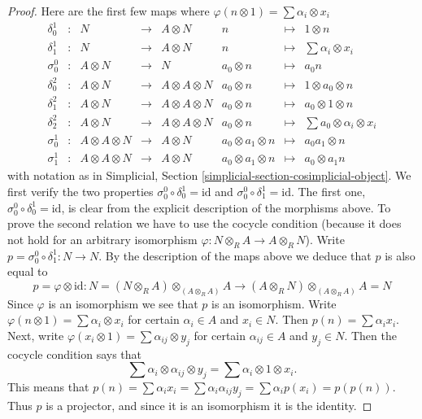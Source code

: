 \begin{proof}
Here are the first few maps
where $\varphi(n \otimes 1) = \sum \alpha_i \otimes x_i$
$$
\begin{matrix}
\delta^1_0 & : & N & \to & A \otimes N & n & \mapsto & 1 \otimes n \\
\delta^1_1 & : & N & \to & A \otimes N & n & \mapsto &
\sum \alpha_i \otimes x_i\\
\sigma^0_0 & : & A \otimes N & \to & N & a_0 \otimes n & \mapsto & a_0n \\
\delta^2_0 & : & A \otimes N & \to & A \otimes A \otimes N &
a_0 \otimes n & \mapsto & 1 \otimes a_0 \otimes n \\
\delta^2_1 & : & A \otimes N & \to & A \otimes A \otimes N &
a_0 \otimes n & \mapsto & a_0 \otimes 1 \otimes n \\
\delta^2_2 & : & A \otimes N & \to & A \otimes A \otimes N &
a_0 \otimes n & \mapsto & \sum a_0 \otimes \alpha_i \otimes x_i \\
\sigma^1_0 & : & A \otimes A \otimes N & \to & A \otimes N &
a_0 \otimes a_1 \otimes n & \mapsto & a_0a_1 \otimes n \\
\sigma^1_1 & : & A \otimes A \otimes N & \to & A \otimes N &
a_0 \otimes a_1 \otimes n & \mapsto & a_0 \otimes a_1n
\end{matrix}
$$
with notation as in
Simplicial, Section \ref{simplicial-section-cosimplicial-object}.
We first verify the two properties $\sigma^0_0 \circ \delta^1_0 = \text{id}$
and $\sigma^0_0 \circ \delta^1_1 = \text{id}$.
The first one, $\sigma^0_0 \circ \delta^1_0 = \text{id}$, is clear from
the explicit description of the morphisms above.
To prove the second relation we have to use the cocycle condition
(because it does not hold for an arbitrary isomorphism
$\varphi : N \otimes_R A \to A \otimes_R N$). Write
$p = \sigma^0_0 \circ \delta^1_1 : N \to N$. By the description of the
maps above we deduce that $p$ is also equal to
$$
p = \varphi \otimes \text{id} :
N = (N \otimes_R A) \otimes_{(A \otimes_R A)} A
\longrightarrow
(A \otimes_R N) \otimes_{(A \otimes_R A)} A = N
$$
Since $\varphi$ is an isomorphism we see that $p$ is an isomorphism.
Write $\varphi(n \otimes 1) = \sum \alpha_i \otimes x_i$ for certain
$\alpha_i \in A$ and $x_i \in N$. Then $p(n) = \sum \alpha_ix_i$.
Next, write
$\varphi(x_i \otimes 1) = \sum \alpha_{ij} \otimes y_j$ for
certain $\alpha_{ij} \in A$ and $y_j \in N$. Then the cocycle condition
says that
$$
\sum \alpha_i \otimes \alpha_{ij} \otimes y_j
=
\sum \alpha_i \otimes 1 \otimes x_i.
$$
This means that $p(n) = \sum \alpha_ix_i = \sum \alpha_i\alpha_{ij}y_j =
\sum \alpha_i p(x_i) = p(p(n))$. Thus $p$ is a projector, and since it is
an isomorphism it is the identity.


\end{proof}
